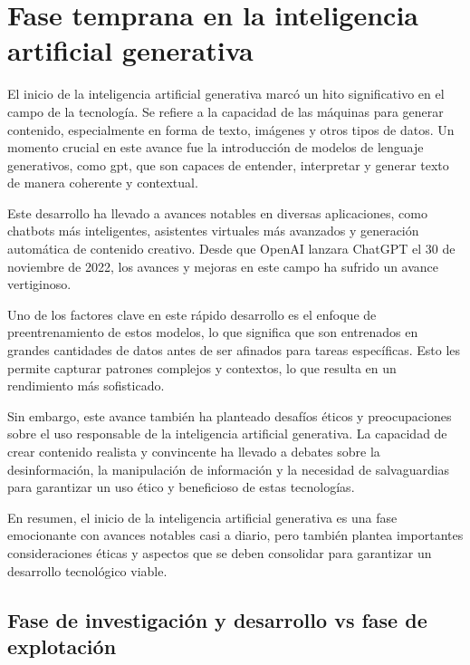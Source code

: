\section{Fase temprana en la inteligencia artificial generativa}

El inicio de la inteligencia artificial generativa marcó un hito significativo en el campo de la tecnología. Se refiere a la capacidad de las máquinas para generar contenido, especialmente en forma de texto, imágenes y otros tipos de datos. Un momento crucial en este avance fue la introducción de modelos de lenguaje generativos, como \acrfull{gpt}, que son capaces de entender, interpretar y generar texto de manera coherente y contextual.

Este desarrollo ha llevado a avances notables en diversas aplicaciones, como chatbots más inteligentes, asistentes virtuales más avanzados y generación automática de contenido creativo. Desde que OpenAI lanzara ChatGPT el 30 de noviembre de 2022, los avances y mejoras en este campo ha sufrido un avance vertiginoso. 


Uno de los factores clave en este rápido desarrollo es el enfoque de preentrenamiento de estos modelos, lo que significa que son entrenados en grandes cantidades de datos antes de ser afinados para tareas específicas. Esto les permite capturar patrones complejos y contextos, lo que resulta en un rendimiento más sofisticado. 

Sin embargo, este avance también ha planteado desafíos éticos y preocupaciones sobre el uso responsable de la inteligencia artificial generativa. La capacidad de crear contenido realista y convincente ha llevado a debates sobre la desinformación, la manipulación de información y la necesidad de salvaguardias para garantizar un uso ético y beneficioso de estas tecnologías.

En resumen, el inicio de la inteligencia artificial generativa es una fase emocionante con avances notables casi a diario, pero también plantea importantes consideraciones éticas y aspectos que se deben consolidar para garantizar un desarrollo tecnológico viable.

\subsection{Fase de investigación y desarrollo vs fase de explotación}

